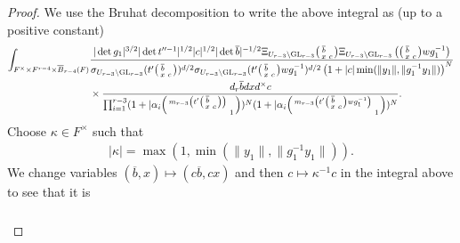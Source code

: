 \documentclass[12pt]{amsart}
\theoremstyle{remark}
\numberwithin{equation}{section}
\newcommand{\GL}{\mathrm{GL}}
\theoremstyle{definition}
\newenvironment{psmatrix}
  {\left(\begin{smallmatrix}}
  {\end{smallmatrix}\right)}
\numberwithin{equation}{subsection}
\newcommand{\norm}[1]{\lVert#1\rVert}
\begin{document}
\begin{proof}
We use the Bruhat decomposition to write the above integral as (up to a positive constant)
\begin{align*}
\int_{F^\times \times F^{r-4} \times \overline{B}_{r-4}(F) }&\frac{|\det g_1|^{3/2}|\det t''^{-1}|^{1/2}|c|^{1/2}|\det \overline{b}|^{-1/2}\Xi_{U_{r-3} \backslash \GL_{r-3}}\begin{psmatrix} \overline{b} & \\ x & c \end{psmatrix}\Xi_{U_{r-3} \backslash \GL_{r-3}}\left(\begin{psmatrix} \overline{b} & \\ x & c \end{psmatrix}wg_1^{-1}\right)}{\sigma_{U_{r-3} \backslash \GL_{r-3}}(t'\begin{psmatrix} \overline{b} & \\ x & c \end{psmatrix})^{d/2}\sigma_{U_{r-3} \backslash \GL_{r-3}}(t'\begin{psmatrix} \overline{b} & \\ x & c \end{psmatrix}wg_1^{-1})^{d/2}\left(1+|c|\min(\norm{y_1},\norm{g_1^{-1}y_1})\right)^{N}}\\& \times
  \frac{d_r\overline{b}dx d^\times c}{ \prod_{i=1}^{r-3}(1+|\alpha_i\begin{psmatrix} m_{r-3}\left(t'\begin{psmatrix} \overline{b} & \\ x & c \end{psmatrix}\right) & \\ & 1 \end{psmatrix})^{N}(1+|\alpha_i\begin{psmatrix} m_{r-3}\left(t'\begin{psmatrix} \overline{b} & \\ x & c \end{psmatrix}wg_1^{-1}\right) & \\ & 1 \end{psmatrix})^{N}} .
\end{align*}
Choose $\kappa \in F^\times$ such that 
\begin{align*}
|\kappa|=\max(1,\min(\norm{y_1},\norm{g_1^{-1}y_1})).
\end{align*} 
We change variables
$(\overline{b},x) \mapsto (c\overline{b},cx)$ and then $c \mapsto \kappa^{-1}c$ in the integral above to see that it is 
\begin{align} \label{before:sig:lemma} \begin{split}

\end{split}
\end{align}
\end{proof}
\end{document}
